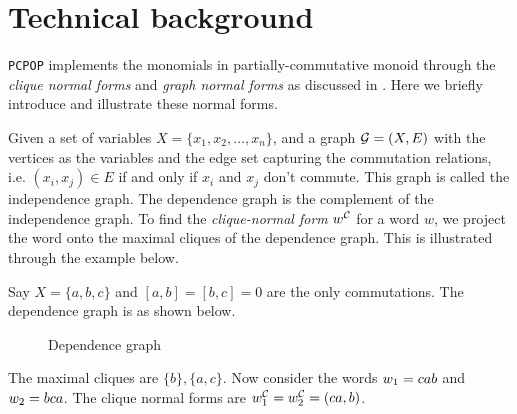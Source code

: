 \section{Technical background}
\texttt{PCPOP} implements the monomials in partially-commutative monoid through the \emph{clique normal forms} and \emph{graph normal forms} as discussed in \cite{}. Here we briefly introduce and illustrate these normal forms.

Given a set of variables $X= \{x_1, x_2, \ldots, x_n\}$, and a graph $\mathcal G=(X,E)$ with the vertices as the variables and the edge set capturing the commutation relations, i.e. $(x_i,x_j) \in E$ if and only if $x_i$ and $x_j$ don't commute. This graph is called the independence graph. The dependence graph is the complement of the independence graph. To find the \emph{clique-normal form} $w^\mathcal C$ for a word $w$, we project the word onto the maximal cliques of the dependence graph. This is illustrated through the example below.
\begin{example}
Say $X=\{a,b,c\}$ and $[a,b] = [b,c]=0$ are the only commutations. The dependence graph is as shown below.
\begin{figure}[H]
\centering
{}
\caption{Dependence graph}
\end{figure}
The maximal cliques are $\{b\}, \{a,c\}$. Now consider the words $w_1=c a b$ and $w_2=b  c  a$. The clique normal forms are $w^\mathcal C_1 = w^\mathcal C_2 = (c a, b)$.
\end{example}

